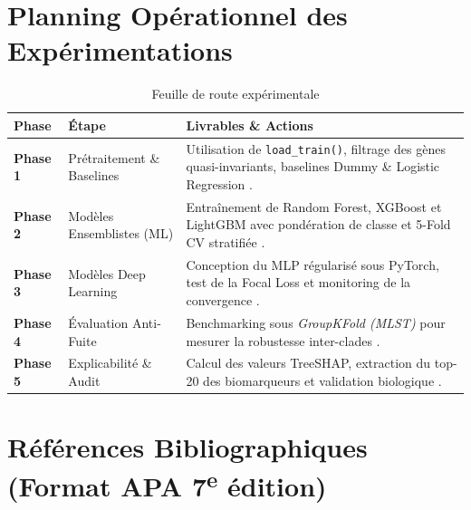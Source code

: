\documentclass[11pt,a4paper]{article}
\begin{document}
\section{Planning Opérationnel des Expérimentations}

\begin{table}[h!]
\centering
\caption{Feuille de route expérimentale}
\vspace{0.2cm}
\begin{tabularx}{\textwidth}{l>{\raggedright\arraybackslash}p{3.5cm}X}
\toprule
\textbf{Phase} & \textbf{Étape} & \textbf{Livrables \& Actions} \\
\midrule
\textbf{Phase 1} & Prétraitement \& Baselines & Utilisation de \texttt{load\_train()}, filtrage des gènes quasi-invariants, baselines Dummy \& Logistic Regression \citep{tibshirani1996regression}. \\
\addlinespace
\textbf{Phase 2} & Modèles Ensemblistes (ML) & Entraînement de Random Forest, XGBoost et LightGBM avec pondération de classe et 5-Fold CV stratifiée \citep{breiman2001random,chen2016xgboost,ke2017lightgbm}. \\
\addlinespace
\textbf{Phase 3} & Modèles Deep Learning & Conception du MLP régularisé sous PyTorch, test de la Focal Loss et monitoring de la convergence \citep{goodfellow2016deep,lin2017focal}. \\
\addlinespace
\textbf{Phase 4} & Évaluation Anti-Fuite & Benchmarking sous \textit{GroupKFold (MLST)} pour mesurer la robustesse inter-clades \citep{earle2016identifying,moradigaravand2018prediction}. \\
\addlinespace
\textbf{Phase 5} & Explicabilité \& Audit & Calcul des valeurs TreeSHAP, extraction du top-20 des biomarqueurs et validation biologique \citep{lundberg2020local,hooper2015quinolone}. \\
\bottomrule
\end{tabularx}
\label{tab:roadmap}
\end{table}

\newpage
\section{Références Bibliographiques (Format APA \texorpdfstring{7\textsuperscript{e}}{7e} édition)}
\end{document}
